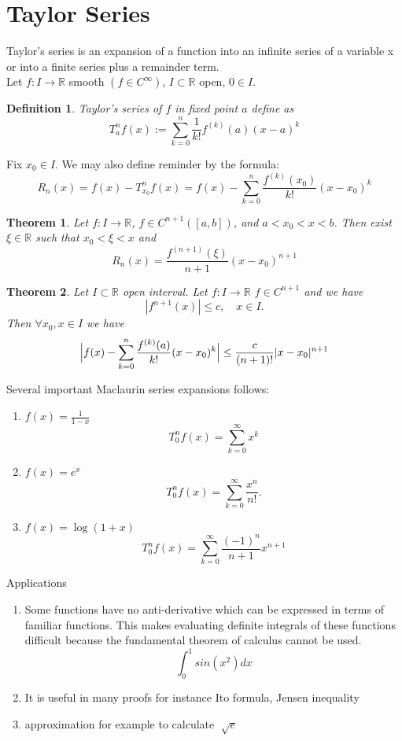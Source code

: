 \documentclass{book}
\newtheorem{definition}{Definition}[section]
\newtheorem{theorem}{Theorem}[section]
\begin{document}
\section{Taylor Series}
Taylor's series is an expansion of a function into an infinite series of a variable x or into a finite series plus a remainder term.\\
Let $f\colon I\to\mathbb{R}$ smooth $(f\in C^{\infty})$, $I\subset\mathbb{R}$ open, $0\in I$. 
\begin{definition}
Taylor's series of $f$ in fixed point $a$ define as
$$
T_{a}^{n}f(x):=\sum_{k=0}^{n}\frac{1}{k!}f^{(k)}(a)(x-a)^{k}
$$
\end{definition}
Fix $x_{0}\in I$. We may also define reminder by the formula:
$$
R_{n}(x)=f(x)-T_{x_{0}}^{n}f(x)=f(x)-\sum_{k=0}^{n}\frac{f^{(k)}(x_{0})}{k!}(x-x_{0})^{k}
$$
\begin{theorem}
Let $f\colon I\to\mathbb{R}$, $f\in C^{n+1}([a,b])$, and $a<x_{0}<x<b$. Then exist $\xi\in\mathbb{R}$ such that $x_{0}<\xi<x$ and 
$$
R_{n}(x)=\frac{f^{(n+1)}(\xi)}{n+1}(x-x_{0})^{n+1}
$$
\end{theorem}
\begin{theorem}
Let $I\subset\mathbb{R}$ open interval. Let $f\colon I\to\mathbb{R}$ $f\in C^{n+1}$ and we have
$$
|f^{n+1}(x)|\leq c,\quad x\in I. 
$$
Then $\forall x_{0},x\in I$ we have
$$
\Big{|}f(x)-\sum_{k=0}^{n}\frac{f^{(k)}(a)}{k!}(x-x_{0})^{k}\Big{|}\leq \frac{c}{(n+1)!}|x-x_{0}|^{n+1}
$$
\end{theorem}
Several important Maclaurin series expansions follows:
\begin{enumerate}
\item $f(x)=\frac{1}{1-x}$
$$
T_{0}^{n}f(x)=\sum_{k=0}^{\infty}x^{k}
$$
\item $f(x)=e^{x}$
$$
T_{0}^{n}f(x)=\sum_{k=0}^{\infty}\frac{x^{n}}{n!}.
$$
\item $f(x)=\log(1+x)$
$$
T_{0}^{n}f(x)=\sum_{k=0}^{\infty}\frac{(-1)^{n}}{n+1}x^{n+1}
$$
\end{enumerate}
Applications
\begin{enumerate}
\item Some functions have no anti-derivative which can be expressed in terms of familiar functions. This makes evaluating definite integrals of these functions difficult because the fundamental theorem of calculus cannot be used.
$$
\int_{0}^{1}sin(x^{2})dx
$$
\item It is useful in many proofs for instance Ito formula, Jensen inequality
\item approximation for example to calculate $\sqrt[]{e}$
\end{enumerate}
\end{document}
